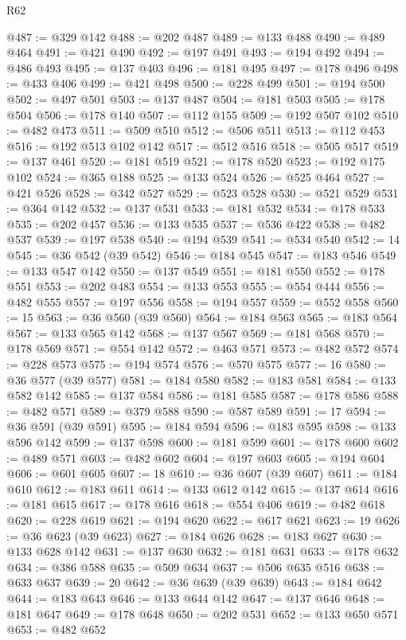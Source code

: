 \begin{lexlean}{R62}
\begin{coremodule}
@487 := @329 @142
@488 := @202 @487
@489 := @133 @488
@490 := @489 @464
@491 := @421 @490
@492 := @197 @491
@493 := @194 @492
@494 := @486 @493
@495 := @137 @403
@496 := @181 @495
@497 := @178 @496
@498 := @433 @406
@499 := @421 @498
@500 := @228 @499
@501 := @194 @500
@502 := @497 @501
@503 := @137 @487
@504 := @181 @503
@505 := @178 @504
@506 := @178 @140
@507 := @112 @155
@509 := @192 @507 @102
@510 := @482 @473
@511 := @509 @510
@512 := @506 @511
@513 := @112 @453
@516 := @192 @513 @102 @142
@517 := @512 @516
@518 := @505 @517
@519 := @137 @461
@520 := @181 @519
@521 := @178 @520
@523 := @192 @175 @102
@524 := @365 @188
@525 := @133 @524
@526 := @525 @464
@527 := @421 @526
@528 := @342 @527
@529 := @523 @528
@530 := @521 @529
@531 := @364 @142
@532 := @137 @531
@533 := @181 @532
@534 := @178 @533
@535 := @202 @457
@536 := @133 @535
@537 := @536 @422
@538 := @482 @537
@539 := @197 @538
@540 := @194 @539
@541 := @534 @540
@542 := 14
@545 := @36 @542 (@39 @542)
@546 := @184 @545
@547 := @183 @546
@549 := @133 @547 @142
@550 := @137 @549
@551 := @181 @550
@552 := @178 @551
@553 := @202 @483
@554 := @133 @553
@555 := @554 @444
@556 := @482 @555
@557 := @197 @556
@558 := @194 @557
@559 := @552 @558
@560 := 15
@563 := @36 @560 (@39 @560)
@564 := @184 @563
@565 := @183 @564
@567 := @133 @565 @142
@568 := @137 @567
@569 := @181 @568
@570 := @178 @569
@571 := @554 @142
@572 := @463 @571
@573 := @482 @572
@574 := @228 @573
@575 := @194 @574
@576 := @570 @575
@577 := 16
@580 := @36 @577 (@39 @577)
@581 := @184 @580
@582 := @183 @581
@584 := @133 @582 @142
@585 := @137 @584
@586 := @181 @585
@587 := @178 @586
@588 := @482 @571
@589 := @379 @588
@590 := @587 @589
@591 := 17
@594 := @36 @591 (@39 @591)
@595 := @184 @594
@596 := @183 @595
@598 := @133 @596 @142
@599 := @137 @598
@600 := @181 @599
@601 := @178 @600
@602 := @489 @571
@603 := @482 @602
@604 := @197 @603
@605 := @194 @604
@606 := @601 @605
@607 := 18
@610 := @36 @607 (@39 @607)
@611 := @184 @610
@612 := @183 @611
@614 := @133 @612 @142
@615 := @137 @614
@616 := @181 @615
@617 := @178 @616
@618 := @554 @406
@619 := @482 @618
@620 := @228 @619
@621 := @194 @620
@622 := @617 @621
@623 := 19
@626 := @36 @623 (@39 @623)
@627 := @184 @626
@628 := @183 @627
@630 := @133 @628 @142
@631 := @137 @630
@632 := @181 @631
@633 := @178 @632
@634 := @386 @588
@635 := @509 @634
@637 := @506 @635 @516
@638 := @633 @637
@639 := 20
@642 := @36 @639 (@39 @639)
@643 := @184 @642
@644 := @183 @643
@646 := @133 @644 @142
@647 := @137 @646
@648 := @181 @647
@649 := @178 @648
@650 := @202 @531
@652 := @133 @650 @571
@653 := @482 @652

\end{coremodule}
\end{lexlean}
